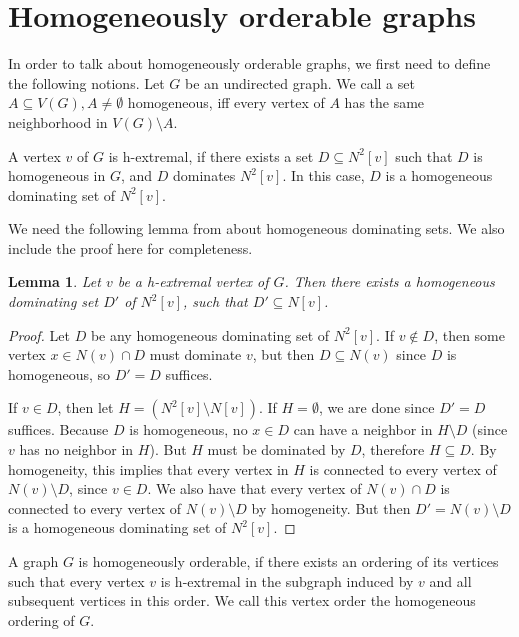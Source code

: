\documentclass[a4paper, 12pt]{article}
\newtheorem{lemma}[theorem]{Lemma}
\begin{document}
\section{Homogeneously orderable graphs}

In order to talk about homogeneously orderable graphs, we first need to define the following notions.
Let $G$ be an undirected graph. We call a set $A \subseteq V(G), A \not= \emptyset $ homogeneous, iff every vertex of $A$ has the same neighborhood in $V(G)\setminus A$. 

A vertex $v$ of $G$ is h-extremal, if there exists a set $D \subseteq N^2[v]$ such that $D$ is homogeneous in $G$, and $D$ dominates $N^2[v]$. In this case, $D$ is a homogeneous dominating set of $N^2[v]$.

We need the following lemma from \cite{brandstadt1997homogeneously} about homogeneous dominating sets. We also include the proof here for completeness.

\begin{lemma}{\cite{brandstadt1997homogeneously}}\label{lem:hom_ord_n}
Let $v$ be a h-extremal vertex of $G$. Then there exists a homogeneous dominating set $D'$ of $N^2[v]$, such that $D' \subseteq N[v]$. 
\end{lemma}

\begin{proof}
    Let $D$ be any homogeneous dominating set of $N^2[v]$. If $v \notin D$, then some vertex $x \in N(v) \cap D$ must dominate $v$, but then $D \subseteq N(v)$ since $D$ is homogeneous, so $D' = D$ suffices.

    If $v \in D$, then let $H = (N^2[v] \setminus N[v])$. If $H = \emptyset$, we are done since $D' = D$ suffices. Because $D$ is homogeneous, no $x \in D$ can have a neighbor in $H\setminus D$ (since $v$ has no neighbor in $H$). But $H$ must be dominated by $D$, therefore $H \subseteq D$. By homogeneity, this implies that every vertex in $H$ is connected to every vertex of $N(v)\setminus D$, since $v \in D$. We also have that every vertex of $N(v)\cap D$ is connected to every vertex of $N(v) \setminus D$ by homogeneity. But then $D' = N(v)\setminus D$ is a homogeneous dominating set of $N^2[v]$.
\end{proof}

A graph $G$ is homogeneously orderable, if there exists an ordering of its vertices such that every vertex $v$ is h-extremal in the subgraph induced by $v$ and all subsequent vertices in this order. We call this vertex order the homogeneous ordering of $G$.
\end{document}

